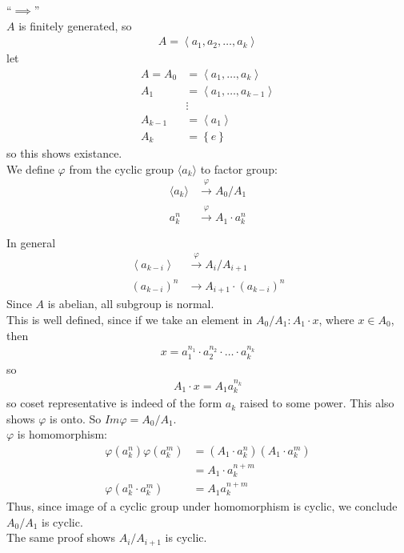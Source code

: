 \documentclass{article}
\begin{document}
\begin{homeworkProblem}
    ``$\implies$''\\
    $A$ is finitely generated, so
    \begin{align}
        A = \left\langle a_1, a_2, \ldots, a_k \right\rangle
    \end{align}
    let 
    \begin{align}
        A = A_0 &= \left\langle a_1, \ldots, a_k \right\rangle\\
        A_1 &= \left\langle a_1, \ldots, a_{k-1} \right\rangle\\
        &\vdots\\
        A_{k-1} &= \left\langle a_1 \right\rangle\\
        A_k &= \left\{ e \right\}
    \end{align}
    so this shows existance.\\
    We define $\varphi$ from the cyclic group $\langle a_k \rangle$ to factor group:
    \begin{align}
        \langle a_k \rangle &\xrightarrow[]{\varphi} A_0 / A_1\\
        a_k^n &\xrightarrow[]{\varphi} A_1 \cdot a_k^n\\
    \end{align}
    In general
    \begin{align}
        \left\langle a_{k-i} \right\rangle &\xrightarrow[]{\varphi} A_i / A_{i+1}\\
        (a_{k-i})^n &\rightarrow A_{i+1} \cdot (a_{k-i})^n
    \end{align}
    Since $A$ is abelian, all subgroup is normal.\\
    This is well defined, since if we take an element
    in $A_0/A_1 : A_1 \cdot x$, where $x \in A_0$,
    then
    \begin{align}
        x = a_1^{n_1} \cdot a_2^{n_2} \cdot \ldots \cdot a_k^{n_k}
    \end{align}
    so 
    \begin{align}
        A_1 \cdot x = A_1 a_k^{n_k}
    \end{align}
    so coset representative is indeed of the form 
    $a_{k}$ raised to some power. This also shows
    $\varphi$ is onto. So $Im \varphi = A_0 / A_1$.\\
    $\varphi$ is homomorphism:
    \begin{align}
        \varphi (a_k^n)\varphi (a_k^m) &= (A_1 \cdot a_k^n) (A_1 \cdot a_k^m)\\
        &= A_1 \cdot a_k^{n+m}\\
        \varphi (a_k^n \cdot a_k^m) &= A_1 a_k^{n+m}
    \end{align}
    Thus, since image of a cyclic group under homomorphism 
    is cyclic, we conclude $A_0 / A_1$ is cyclic.\\
    The same proof shows $A_i / A_{i+1}$ is cyclic.\\

\end{homeworkProblem}
\end{document}
